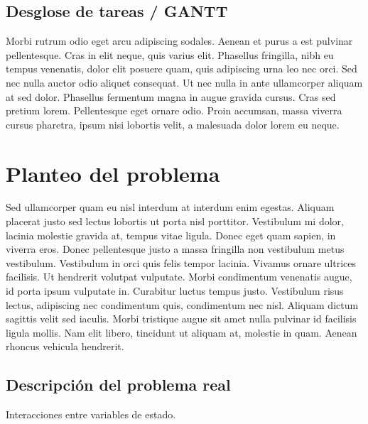 
\subsection{Desglose de tareas / GANTT}
Morbi rutrum odio eget arcu adipiscing sodales. Aenean et purus a est pulvinar pellentesque. Cras in elit neque, quis varius elit. Phasellus fringilla, nibh eu tempus venenatis, dolor elit posuere quam, quis adipiscing urna leo nec orci. Sed nec nulla auctor odio aliquet consequat. Ut nec nulla in ante ullamcorper aliquam at sed dolor. Phasellus fermentum magna in augue gravida cursus. Cras sed pretium lorem. Pellentesque eget ornare odio. Proin accumsan, massa viverra cursus pharetra, ipsum nisi lobortis velit, a malesuada dolor lorem eu neque.


\section{Planteo del problema}

Sed ullamcorper quam eu nisl interdum at interdum enim egestas. Aliquam placerat justo sed lectus lobortis ut porta nisl porttitor. Vestibulum mi dolor, lacinia molestie gravida at, tempus vitae ligula. Donec eget quam sapien, in viverra eros. Donec pellentesque justo a massa fringilla non vestibulum metus vestibulum. Vestibulum in orci quis felis tempor lacinia. Vivamus ornare ultrices facilisis. Ut hendrerit volutpat vulputate. Morbi condimentum venenatis augue, id porta ipsum vulputate in. Curabitur luctus tempus justo. Vestibulum risus lectus, adipiscing nec condimentum quis, condimentum nec nisl. Aliquam dictum sagittis velit sed iaculis. Morbi tristique augue sit amet nulla pulvinar id facilisis ligula mollis. Nam elit libero, tincidunt ut aliquam at, molestie in quam. Aenean rhoncus vehicula hendrerit.


\subsection{Descripción del problema real}

Interacciones entre variables de estado.

